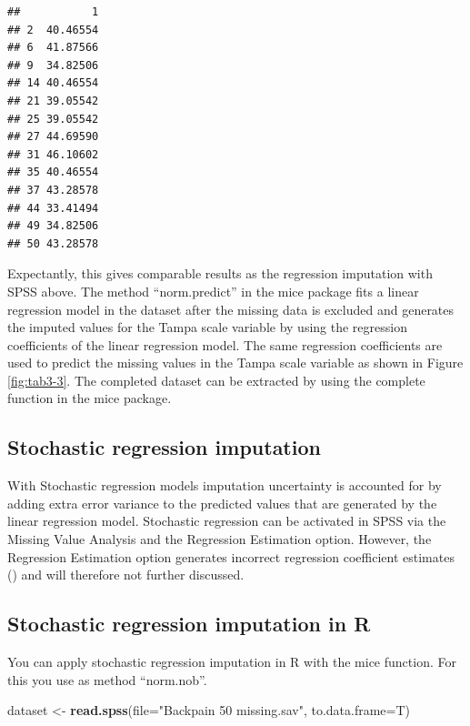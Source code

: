 \documentclass[]{book}
\newenvironment{Shaded}{\begin{snugshade}}{\end{snugshade}}
\newcommand{\KeywordTok}[1]{\textcolor[rgb]{0.13,0.29,0.53}{\textbf{#1}}}
\newcommand{\DataTypeTok}[1]{\textcolor[rgb]{0.13,0.29,0.53}{#1}}
\newcommand{\StringTok}[1]{\textcolor[rgb]{0.31,0.60,0.02}{#1}}
\newcommand{\NormalTok}[1]{#1}
\begin{document}
\begin{verbatim}
##           1
## 2  40.46554
## 6  41.87566
## 9  34.82506
## 14 40.46554
## 21 39.05542
## 25 39.05542
## 27 44.69590
## 31 46.10602
## 35 40.46554
## 37 43.28578
## 44 33.41494
## 49 34.82506
## 50 43.28578
\end{verbatim}

Expectantly, this gives comparable results as the regression imputation
with SPSS above. The method ``norm.predict'' in the mice package fits a
linear regression model in the dataset after the missing data is
excluded and generates the imputed values for the Tampa scale variable
by using the regression coefficients of the linear regression model. The
same regression coefficients are used to predict the missing values in
the Tampa scale variable as shown in Figure \ref{fig:tab3-3}. The
completed dataset can be extracted by using the complete function in the
mice package.

\subsection{Stochastic regression
imputation}\label{stochastic-regression-imputation}

With Stochastic regression models imputation uncertainty is accounted
for by adding extra error variance to the predicted values that are
generated by the linear regression model. Stochastic regression can be
activated in SPSS via the Missing Value Analysis and the Regression
Estimation option. However, the Regression Estimation option generates
incorrect regression coefficient estimates (\citet{hippel1}) and will
therefore not further discussed.

\subsection{Stochastic regression imputation in
R}\label{stochastic-regression-imputation-in-r}

You can apply stochastic regression imputation in R with the mice
function. For this you use as method ``norm.nob''.

\begin{Shaded}
\begin{Highlighting}[]
\NormalTok{dataset <-}\StringTok{ }\KeywordTok{read.spss}\NormalTok{(}\DataTypeTok{file=}\StringTok{"Backpain 50 missing.sav"}\NormalTok{, }\DataTypeTok{to.data.frame=}\NormalTok{T)}
\end{Highlighting}
\end{Shaded}
\end{document}
